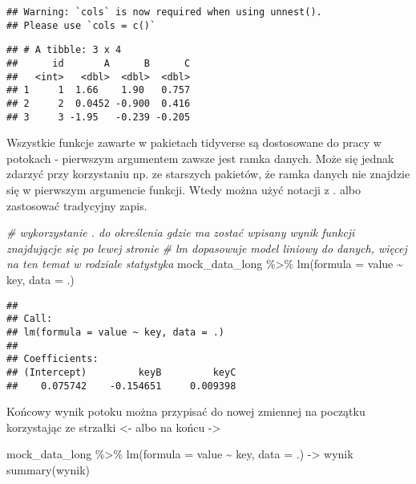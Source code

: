 \documentclass[
]{book}
\newenvironment{Shaded}{\begin{snugshade}}{\end{snugshade}}
\newcommand{\AttributeTok}[1]{\textcolor[rgb]{0.77,0.63,0.00}{#1}}
\newcommand{\CommentTok}[1]{\textcolor[rgb]{0.56,0.35,0.01}{\textit{#1}}}
\newcommand{\FunctionTok}[1]{\textcolor[rgb]{0.00,0.00,0.00}{#1}}
\newcommand{\NormalTok}[1]{#1}
\newcommand{\OtherTok}[1]{\textcolor[rgb]{0.56,0.35,0.01}{#1}}
\newcommand{\SpecialCharTok}[1]{\textcolor[rgb]{0.00,0.00,0.00}{#1}}
\begin{document}
\begin{verbatim}
## Warning: `cols` is now required when using unnest().
## Please use `cols = c()`
\end{verbatim}

\begin{verbatim}
## # A tibble: 3 x 4
##      id       A      B      C
##   <int>   <dbl>  <dbl>  <dbl>
## 1     1  1.66    1.90   0.757
## 2     2  0.0452 -0.900  0.416
## 3     3 -1.95   -0.239 -0.205
\end{verbatim}

Wszystkie funkcje zawarte w pakietach tidyverse są dostosowane do pracy w potokach - pierwszym argumentem zawsze jest ramka danych. Może się jednak zdarzyć przy korzystaniu np. ze starszych pakietów, że ramka danych nie znajdzie się w pierwszym argumencie funkcji. Wtedy można użyć notacji z . albo zastosować tradycyjny zapis.

\begin{Shaded}
\begin{Highlighting}[]
\CommentTok{\# wykorzystanie . do określenia gdzie ma zostać wpisany wynik funkcji znajdującje się po lewej stronie}
\CommentTok{\# lm dopasowuje model liniowy do danych, więcej na ten temat w rodziale statystyka}
\NormalTok{mock\_data\_long }\SpecialCharTok{\%\textgreater{}\%} \FunctionTok{lm}\NormalTok{(}\AttributeTok{formula =}\NormalTok{ value }\SpecialCharTok{\textasciitilde{}}\NormalTok{ key, }\AttributeTok{data =}\NormalTok{ .)}
\end{Highlighting}
\end{Shaded}

\begin{verbatim}
## 
## Call:
## lm(formula = value ~ key, data = .)
## 
## Coefficients:
## (Intercept)         keyB         keyC  
##    0.075742    -0.154651     0.009398
\end{verbatim}

Końcowy wynik potoku można przypisać do nowej zmiennej na początku korzystając ze strzałki \textless- albo na końcu -\textgreater{}

\begin{Shaded}
\begin{Highlighting}[]
\NormalTok{mock\_data\_long }\SpecialCharTok{\%\textgreater{}\%} \FunctionTok{lm}\NormalTok{(}\AttributeTok{formula =}\NormalTok{ value }\SpecialCharTok{\textasciitilde{}}\NormalTok{ key, }\AttributeTok{data =}\NormalTok{ .) }\OtherTok{{-}\textgreater{}}\NormalTok{ wynik}
\FunctionTok{summary}\NormalTok{(wynik)}
\end{Highlighting}
\end{Shaded}
\end{document}
